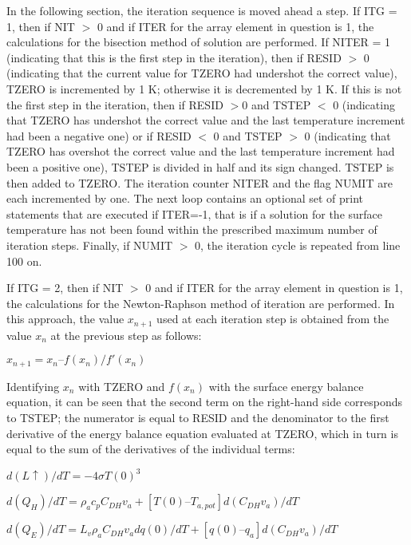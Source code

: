 In the following section, the iteration sequence is moved ahead a step. If I\+T\+G = 1, then if N\+I\+T $>$ 0 and if I\+T\+E\+R for the array element in question is 1, the calculations for the bisection method of solution are performed. If N\+I\+T\+E\+R = 1 (indicating that this is the first step in the iteration), then if R\+E\+S\+I\+D $>$ 0 (indicating that the current value for T\+Z\+E\+R\+O had undershot the correct value), T\+Z\+E\+R\+O is incremented by 1 K; otherwise it is decremented by 1 K. If this is not the first step in the iteration, then if R\+E\+S\+I\+D $>$0 and T\+S\+T\+E\+P $<$ 0 (indicating that T\+Z\+E\+R\+O has undershot the correct value and the last temperature increment had been a negative one) or if R\+E\+S\+I\+D $<$ 0 and T\+S\+T\+E\+P $>$ 0 (indicating that T\+Z\+E\+R\+O has overshot the correct value and the last temperature increment had been a positive one), T\+S\+T\+E\+P is divided in half and its sign changed. T\+S\+T\+E\+P is then added to T\+Z\+E\+R\+O. The iteration counter N\+I\+T\+E\+R and the flag N\+U\+M\+I\+T are each incremented by one. The next loop contains an optional set of print statements that are executed if I\+T\+E\+R=-\/1, that is if a solution for the surface temperature has not been found within the prescribed maximum number of iteration steps. Finally, if N\+U\+M\+I\+T $>$ 0, the iteration cycle is repeated from line 100 on.

If I\+T\+G = 2, then if N\+I\+T $>$ 0 and if I\+T\+E\+R for the array element in question is 1, the calculations for the Newton-\/\+Raphson method of iteration are performed. In this approach, the value $x_{n+1}$ used at each iteration step is obtained from the value $x_n$ at the previous step as follows\+:

$x_{n+1} = x_n – f(x_n)/f'(x_n)$

Identifying $x_n$ with T\+Z\+E\+R\+O and $f(x_n)$ with the surface energy balance equation, it can be seen that the second term on the right-\/hand side corresponds to T\+S\+T\+E\+P; the numerator is equal to R\+E\+S\+I\+D and the denominator to the first derivative of the energy balance equation evaluated at T\+Z\+E\+R\+O, which in turn is equal to the sum of the derivatives of the individual terms\+:

$d( L \uparrow )/dT = -4 \sigma T(0)^3$

$d(Q_H)/dT = \rho_a c_p {C_{DH} v_a + [T(0) – T_{a,pot}] d(C_{DH} v_a)/dT}$

$d(Q_E)/dT = L_v \rho_a{C_{DH} v_a dq(0)/dT+ [q(0) – q_a] d(C_{DH} v_a)/dT}$


